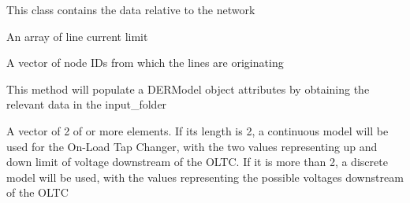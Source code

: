 \documentclass[letterpaper,10pt,english]{sphinxmanual}
\begin{document}
\begin{fulllineitems}
\label{ropf:ropf.Simulation.NetworkModel}
This class contains the data relative to the network

\begin{fulllineitems}
\label{ropf:ropf.Simulation.NetworkModel.current_limit}
An array of line current limit

\end{fulllineitems}


\begin{fulllineitems}
\label{ropf:ropf.Simulation.NetworkModel.from_node}
A vector of node IDs from which the lines are originating

\end{fulllineitems}


\begin{fulllineitems}
\label{ropf:ropf.Simulation.NetworkModel.init_networkmodel}
This method will populate a DERModel object attributes by obtaining the relevant
data in the input\_folder

\end{fulllineitems}


\begin{fulllineitems}
\label{ropf:ropf.Simulation.NetworkModel.oltc_constraints}
A vector of 2 of or more elements. If its length is 2, a continuous model will be used for
the On-Load Tap Changer, with the two values representing up and down limit of voltage downstream of the OLTC.
If it is more than 2, a discrete model will be used, with the values representing the possible voltages
downstream of the OLTC

\end{fulllineitems}



\end{fulllineitems}
\end{document}
